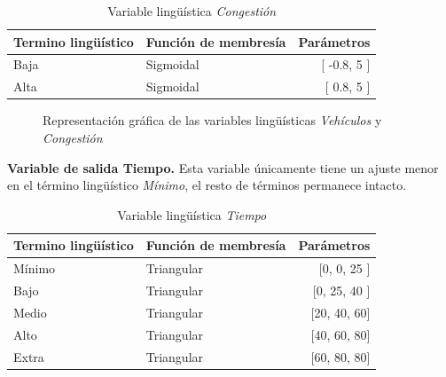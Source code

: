 \begin{table}[!h]
	\centering
	\begin{tabular}{llr} \toprule
		Termino lingüístico & Función de membresía & Parámetros \\ \midrule
		Baja & Sigmoidal & [ -0.8, 5 ] \\
		Alta & Sigmoidal & [ 0.8, 5 ] \\ \bottomrule
	\end{tabular}
	\caption[Variable lingüística \textit{Congestión} (configuración \textit{D})]{Variable lingüística \textit{Congestión}}
\end{table}
\begin{figure}[H]
	\centering
	\caption[Representación gráfica de las variables lingüísticas \textit{Vehículos} y \textit{Congestión} (configuración \textit{D})]{Representación gráfica de las variables lingüísticas \textit{Vehículos} y \textit{Congestión}}
\end{figure}
\newpage
\textbf{Variable de salida Tiempo.} Esta variable únicamente tiene un ajuste menor en el término lingüístico \textit{Mínimo}, el resto de términos permanece intacto.

\begin{table}[!h]
	\centering
	\begin{tabular}{llr} \toprule
		Termino lingüístico & Función de membresía & Parámetros \\ \midrule
		Mínimo & Triangular & [0, 0, 25 ] \\
		Bajo & Triangular & [0, 25, 40 ] \\
		Medio & Triangular & [20, 40, 60] \\
		Alto & Triangular & [40, 60, 80] \\
		Extra & Triangular & [60, 80, 80] \\ \bottomrule
	\end{tabular}
	\caption[Variable lingüística \textit{Tiempo} (configuración \textit{D})]{Variable lingüística \textit{Tiempo}}
\end{table}


